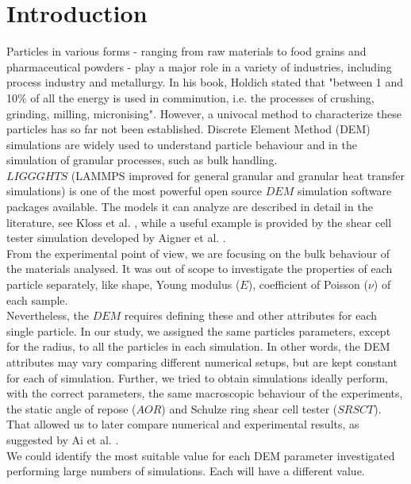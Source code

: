 \section{Introduction}
\label{sec:introduction}

Particles in various forms - ranging from raw materials to food grains and pharmaceutical powders - 
play a major role in a variety of industries, including process industry and metallurgy. 
In his book, Holdich \cite{RefWorks:117} stated that "between 1 and 10\% of all the energy 
is used in comminution, i.e. the processes of crushing, grinding, milling, micronising". 
However, a univocal method to characterize these particles has so far not been established. 
Discrete Element Method (DEM) simulations are widely used to understand particle behaviour 
and in the simulation of granular processes, such as bulk handling.\\
$LIGGGHTS$ (LAMMPS improved for general granular and granular heat transfer simulations) 
is one of the most powerful open source $DEM$ simulation software packages available. 
The models it can analyze are described in detail in the literature, see Kloss
et al. \cite{RefWorks:136}, while a useful example is provided by the shear cell tester 
simulation developed by Aigner et al. \cite{RefWorks:139}.\\
From the experimental point of view, we are focusing on the bulk behaviour of the materials analysed. 
It was out of scope to investigate the properties of each particle separately, like shape, 
Young modulus ($E$), coefficient of Poisson ($\nu$) of each sample.\\
Nevertheless, the $DEM$ requires defining these and other attributes for each
single particle.
In our study, we assigned the same particles parameters, except for the radius, to all the 
particles in each simulation. 
In other words, the DEM attributes may vary comparing different 
numerical setups, but are kept constant for each of simulation. 
Further, we tried to obtain simulations ideally perform, with the correct parameters, 
the same macroscopic behaviour of the experiments, the static angle of repose
($AOR$) and Schulze ring shear cell tester ($SRSCT$). That allowed us to later
compare numerical and experimental results, as suggested by Ai et al.
\cite{RefWorks:131}.\\
We could identify the most suitable value for each DEM parameter 
investigated performing large numbers of simulations. Each will have a different value. 
